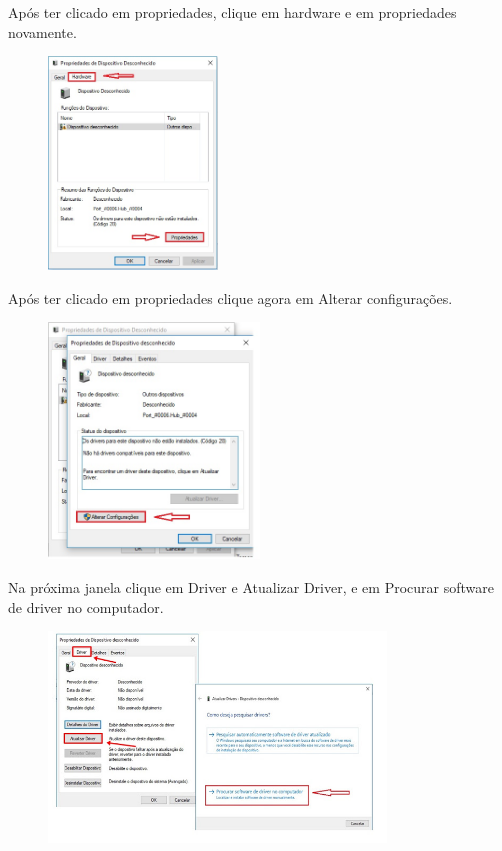 \documentclass[
	12pt,			%
	openright,		%
	oneside,			%
	a4paper,			%
	chapter=TITLE,		%
	english,			%
	brazil,			%
	]{abntex2}
\begin{document}
\begin{anexosenv}
Após ter clicado em propriedades, clique em hardware e em propriedades novamente.

\begin{figure}[H]
	\centering
		\includegraphics[width=0.4\textwidth]{./img/anex-img-13.jpg}
\end{figure}

Após ter clicado em propriedades clique agora em Alterar configurações.

\begin{figure}[H]
	\centering
		\includegraphics[width=0.5\textwidth]{./img/anex-img-14.jpg}
\end{figure}

Na próxima janela clique em Driver e Atualizar Driver, e em Procurar software de driver no computador.

\begin{figure}[H]
	\centering
		\includegraphics[width=0.8\textwidth]{./img/anex-img-15.jpg}
\end{figure}


\end{anexosenv}
\end{document}
